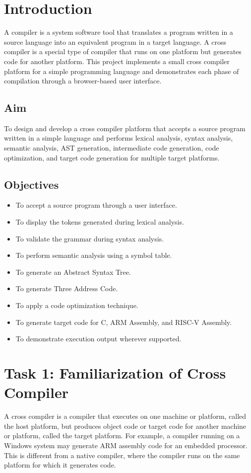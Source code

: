 \documentclass[12pt,a4paper]{report}
\begin{document}
\tableofcontents
\newpage

\chapter{Introduction}
A compiler is a system software tool that translates a program written in a source language into an equivalent program in a target language. A cross compiler is a special type of compiler that runs on one platform but generates code for another platform. This project implements a small cross compiler platform for a simple programming language and demonstrates each phase of compilation through a browser-based user interface.

\section{Aim}
To design and develop a cross compiler platform that accepts a source program written in a simple language and performs lexical analysis, syntax analysis, semantic analysis, AST generation, intermediate code generation, code optimization, and target code generation for multiple target platforms.

\section{Objectives}
\begin{itemize}
    \item To accept a source program through a user interface.
    \item To display the tokens generated during lexical analysis.
    \item To validate the grammar during syntax analysis.
    \item To perform semantic analysis using a symbol table.
    \item To generate an Abstract Syntax Tree.
    \item To generate Three Address Code.
    \item To apply a code optimization technique.
    \item To generate target code for C, ARM Assembly, and RISC-V Assembly.
    \item To demonstrate execution output wherever supported.
\end{itemize}

\chapter{Task 1: Familiarization of Cross Compiler}
A cross compiler is a compiler that executes on one machine or platform, called the host platform, but produces object code or target code for another machine or platform, called the target platform. For example, a compiler running on a Windows system may generate ARM assembly code for an embedded processor. This is different from a native compiler, where the compiler runs on the same platform for which it generates code.
\end{document}
